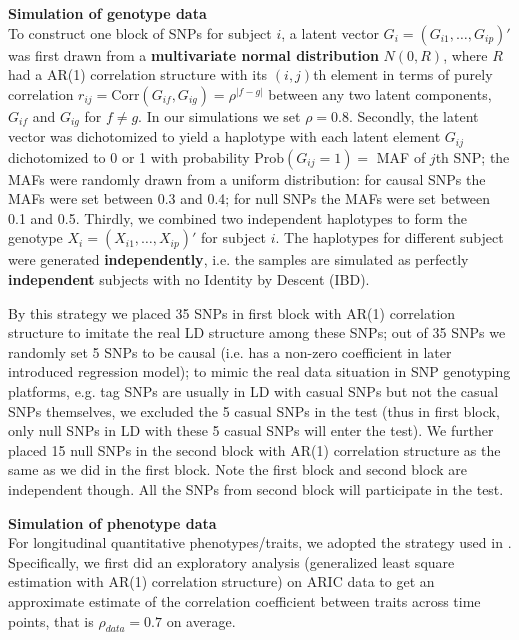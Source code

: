 \documentclass[12pt]{article}
\begin{document}
\textbf{Simulation of genotype data}\\
To construct one block of SNPs for subject $i$, a latent vector $G_i = (G_{i1}, \ldots, G_{ip})'$ was first drawn from a \textbf{multivariate normal distribution} $N(0,R)$, where $R$ had a AR(1) correlation structure with its $(i,j)$th element in terms of purely correlation $r_{ij} =\textrm{Corr} (G_{if}, G_{ig}) = \rho ^ { |f - g| }$ between any two latent components, $G_{if}$ and $G_{ig}$ for $f \neq g$. In our simulations we set $\rho = 0.8$. Secondly, the latent vector was dichotomized to yield a haplotype with each latent element $G_{ij}$ dichotomized to 0 or 1 with probability $\textrm{Prob} (G_{ij} = 1) = $ MAF of $j$th SNP; the MAFs were randomly drawn from a uniform distribution: for causal SNPs the MAFs were set between 0.3 and 0.4; for null SNPs the MAFs were set between 0.1 and 0.5. Thirdly, we combined two independent haplotypes to form the genotype $X_i = (X_{i1}, \ldots, X_{ip})' $ for subject $i$. The haplotypes for different subject were generated \textbf{independently}, i.e. the samples are simulated as perfectly \textbf{independent} subjects with no Identity by Descent (IBD). 

By this strategy we placed 35 SNPs in first block with AR(1) correlation structure to imitate the real LD structure among these SNPs; out of 35 SNPs we randomly set 5 SNPs to be causal (i.e. has a non-zero coefficient in later introduced regression model); to mimic the real data situation in SNP genotyping platforms, e.g. tag SNPs are usually in LD with casual SNPs but not the casual SNPs themselves, we excluded the 5 casual SNPs in the test (thus in first block, only null SNPs in LD with these 5 casual SNPs will enter the test). We further placed 15 null SNPs in the second block with AR(1) correlation structure as the same as we did in the first block. Note the first block and second block are independent though. All the SNPs from second block will participate in the test.

\textbf{Simulation of phenotype data}\\
For longitudinal quantitative phenotypes/traits, we adopted the strategy used in \cite{Song2013}. Specifically, we first did an exploratory analysis (generalized least square estimation with AR(1) correlation structure) on ARIC data to get an approximate estimate of the correlation coefficient between traits across time points, that is $\rho_{data} = 0.7$ on average. 
\end{document}
